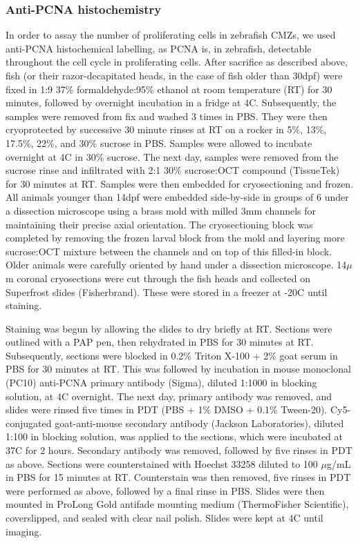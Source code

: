 \subsubsection{Anti-PCNA histochemistry}
\label{ssec:PCNA}
In order to assay the number of proliferating cells in zebrafish CMZs, we used anti-PCNA histochemical labelling, as PCNA is, in zebrafish, detectable throughout the cell cycle in proliferating cells. After sacrifice as described above, fish (or their razor-decapitated heads, in the case of fish older than 30dpf) were fixed in 1:9 37\% formaldehyde:95\% ethanol at room temperature (RT) for 30 minutes, followed by overnight incubation in a fridge at 4\textdegree C. Subsequently, the samples were removed from fix and washed 3 times in PBS. They were then cryoprotected by successive 30 minute rinses at RT on a rocker in 5\%, 13\%, 17.5\%, 22\%, and 30\% sucrose in PBS. Samples were allowed to incubate overnight at 4\textdegree C in 30\% sucrose. The next day, samples were removed from the sucrose rinse and infiltrated with 2:1 30\% sucrose:OCT compound (TissueTek) for 30 minutes at RT. Samples were then embedded for cryosectioning and frozen. All animals younger than 14dpf were embedded side-by-side in groups of 6 under a dissection microscope using a brass mold with milled 3mm channels for maintaining their precise axial orientation. The cryosectioning block was completed by removing the frozen larval block from the mold and layering more sucrose:OCT mixture between the channels and on top of this filled-in block. Older animals were carefully oriented by hand under a dissection microscope. 14$\mu$m coronal cryosections were cut through the fish heads and collected on Superfrost slides (Fisherbrand). These were stored in a freezer at -20\textdegree C until staining.

Staining was begun by allowing the slides to dry briefly at RT. Sections were outlined with a PAP pen, then rehydrated in PBS for 30 minutes at RT. Subsequently, sections were blocked in 0.2\% Triton X-100 + 2\% goat serum in PBS for 30 minutes at RT. This was followed by incubation in mouse monoclonal (PC10) anti-PCNA primary antibody (Sigma), diluted 1:1000 in blocking solution, at 4\textdegree C overnight. The next day, primary antibody was removed, and slides were rinsed five times in PDT (PBS + 1\% DMSO + 0.1\% Tween-20). Cy5-conjugated goat-anti-mouse secondary antibody (Jackson Laboratories), diluted 1:100 in blocking solution, was applied to the sections, which were incubated at 37\textdegree C for 2 hours. Secondary antibody was removed, followed by five rinses in PDT as above. Sections were counterstained with Hoechst 33258 diluted to 100 $\mu$g/mL in PBS for 15 minutes at RT. Counterstain was then removed, five rinses in PDT were performed as above, followed by a final rinse in PBS. Slides were then mounted in ProLong Gold antifade mounting medium (ThermoFisher Scientific), coverslipped, and sealed with clear nail polish. Slides were kept at 4\textdegree C until imaging.

